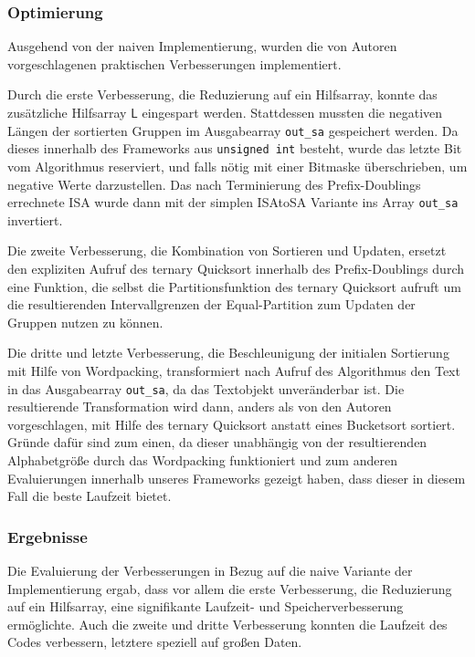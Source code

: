 \subsubsection{Optimierung}
Ausgehend von der naiven Implementierung, wurden die von Autoren vorgeschlagenen praktischen Verbesserungen implementiert. 

Durch die erste Verbesserung, die Reduzierung auf ein Hilfsarray, konnte das zusätzliche Hilfsarray $\mathsf{L}$ eingespart werden. Stattdessen mussten die negativen Längen der sortierten Gruppen im Ausgabearray \texttt{out_sa} gespeichert werden. Da dieses innerhalb des Frameworks aus \texttt{unsigned int} besteht, wurde das letzte Bit vom Algorithmus reserviert, und falls nötig mit einer Bitmaske überschrieben, um \glqq negative\grqq{} Werte darzustellen. Das nach Terminierung des Prefix-Doublings errechnete ISA wurde dann mit der simplen ISAtoSA Variante ins Array \texttt{out_sa} invertiert. 

Die zweite Verbesserung, die Kombination von Sortieren und Updaten, ersetzt den expliziten Aufruf des ternary Quicksort innerhalb des Prefix-Doublings durch eine Funktion, die selbst die Partitionsfunktion des ternary Quicksort aufruft um die resultierenden Intervallgrenzen der Equal-Partition zum Updaten der Gruppen nutzen zu können.

Die dritte und letzte Verbesserung, die Beschleunigung der initialen Sortierung mit Hilfe von Wordpacking, transformiert nach Aufruf des Algorithmus den Text in das Ausgabearray \texttt{out_sa}, da das Textobjekt unveränderbar ist. Die resultierende Transformation wird dann, anders als von den Autoren vorgeschlagen, mit Hilfe des ternary Quicksort anstatt eines Bucketsort sortiert. Gründe dafür sind zum einen, da dieser unabhängig von der resultierenden Alphabetgröße durch das Wordpacking funktioniert und zum anderen Evaluierungen innerhalb unseres Frameworks gezeigt haben, dass dieser in diesem Fall die beste Laufzeit bietet.
\subsubsection{Ergebnisse}
Die Evaluierung der Verbesserungen in Bezug auf die naive Variante der Implementierung ergab, dass vor allem die erste Verbesserung, die Reduzierung auf ein Hilfsarray, eine signifikante Laufzeit- und Speicherverbesserung ermöglichte.
Auch die zweite und dritte Verbesserung konnten die Laufzeit des Codes verbessern, letztere speziell auf großen Daten.

